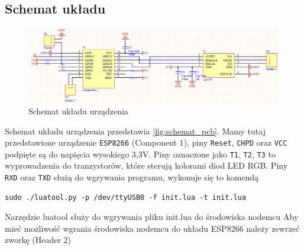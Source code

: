 \subsection{Schemat układu}


\begin{figure}[!htbp]
	\centering
	\includegraphics[width=1.0\textwidth]{images/fig04-schemat.png}
	\caption[Schemat układu urządzenia.]{Schemat układu urządzenia}
	\label{fig:schemat_pcb}
\end{figure}

Schemat układu urządzenia przedstawia \autoref{fig:schemat_pcb}. Mamy tutaj przedstawione urządzenie \texttt{ESP8266} (Component 1), piny \texttt{Reset}, \texttt{CHPD} oraz \texttt{VCC} podpięte są do napięcia wysokiego 3,3V. Piny oznaczone jako \texttt{T1}, \texttt{T2}, \texttt{T3} to wyprowadzenia do tranzystorów, które sterują kolorami diod LED RGB. Piny \texttt{RXD} oraz \texttt{TXD} służą do wgrywania programu, wykonuje się to komendą 
\begin{lstlisting}
sudo ./luatool.py -p /dev/ttyUSB0 -f init.lua -t init.lua
\end{lstlisting} 
Narzędzie luatool\cite{luatool-www} służy do wgrywania pliku init.lua do środowiska nodemcu\cite{nodemcu-www} 
Aby mieć możliwość wgrania środowiska nodemcu\cite{nodemcu-www} do układu ESP8266 należy zewrzeć zworkę (Header 2)
